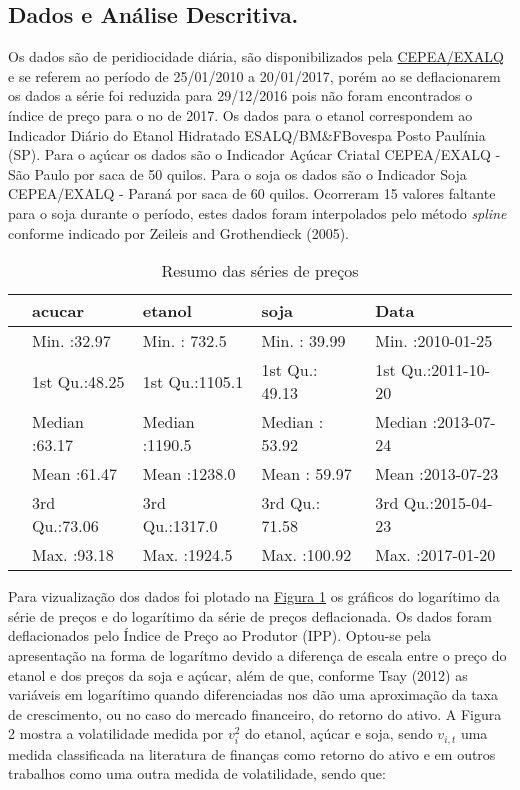 \subsection{Dados e Análise
Descritiva.}\label{dados-e-analise-descritiva.}

Os dados são de peridiocidade diária, são disponibilizados pela
\href{http://www.cepea.esalq.usp.br/br/consultas-ao-banco-de-dados-do-site.aspx}{CEPEA/EXALQ}
e se referem ao período de 25/01/2010 a 20/01/2017, porém ao se
deflacionarem os dados a série foi reduzida para 29/12/2016 pois não
foram encontrados o índice de preço para o no de 2017. Os dados para o
etanol correspondem ao Indicador Diário do Etanol Hidratado
ESALQ/BM\&FBovespa Posto Paulínia (SP). Para o açúcar os dados são o
Indicador Açúcar Criatal CEPEA/EXALQ - São Paulo por saca de 50 quilos.
Para o soja os dados são o Indicador Soja CEPEA/EXALQ - Paraná por saca
de 60 quilos. Ocorreram 15 valores faltante para o soja durante o
período, estes dados foram interpolados pelo método \emph{spline}
conforme indicado por Zeileis and Grothendieck (2005).

\begin{longtable}[t]{lllll}
\caption{\label{tab:unnamed-chunk-5}Resumo das séries de preços}\\
\toprule
  &     acucar &     etanol &      soja &      Data\\
\midrule
 & Min.   :32.97 & Min.   : 732.5 & Min.   : 39.99 & Min.   :2010-01-25\\
 & 1st Qu.:48.25 & 1st Qu.:1105.1 & 1st Qu.: 49.13 & 1st Qu.:2011-10-20\\
 & Median :63.17 & Median :1190.5 & Median : 53.92 & Median :2013-07-24\\
 & Mean   :61.47 & Mean   :1238.0 & Mean   : 59.97 & Mean   :2013-07-23\\
 & 3rd Qu.:73.06 & 3rd Qu.:1317.0 & 3rd Qu.: 71.58 & 3rd Qu.:2015-04-23\\
 & Max.   :93.18 & Max.   :1924.5 & Max.   :100.92 & Max.   :2017-01-20\\
\bottomrule
\end{longtable}

Para vizualização dos dados foi plotado na
\protect\hyperlink{figura1}{Figura 1} os gráficos do logarítimo da série
de preços e do logarítimo da série de preços deflacionada. Os dados
foram deflacionados pelo Índice de Preço ao Produtor (IPP). Optou-se
pela apresentação na forma de logarítmo devido a diferença de escala
entre o preço do etanol e dos preços da soja e açúcar, além de que,
conforme Tsay (2012) as variáveis em logarítimo quando diferenciadas nos
dão uma aproximação da taxa de crescimento, ou no caso do mercado
financeiro, do retorno do ativo. A Figura 2 mostra a volatilidade medida
por \(v_i^2\) do etanol, açúcar e soja, sendo \(v_{i,t}\) uma medida
classificada na literatura de finanças como retorno do ativo e em outros
trabalhos como uma outra medida de volatilidade, sendo que:

